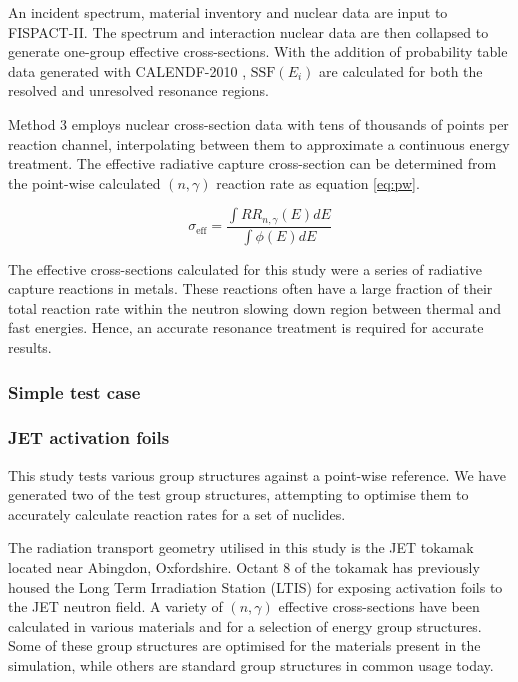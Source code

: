 An incident spectrum, material inventory and nuclear data are input to FISPACT-II. The spectrum and interaction nuclear data are then collapsed to generate one-group effective cross-sections. With the addition of probability table data generated with CALENDF-2010 \cite{sublet2011}, $\mathrm{SSF}(E_i)$ are calculated for both the resolved and unresolved resonance regions.

Method 3 employs nuclear cross-section data with tens of thousands of points per reaction channel, interpolating between them to approximate a continuous energy treatment. The effective radiative capture cross-section can be determined from the point-wise calculated $(n,\gamma)$ reaction rate as equation \ref{eq:pw}. 

\begin{equation}
\label{eq:pw}
\sigma_\mathrm{eff} = \frac{\int RR_{n,\gamma}(E) dE}{\int \phi(E) dE}
\end{equation}


The effective cross-sections calculated for this study were a series of radiative capture reactions in metals. These reactions often have a large fraction of their total reaction rate within the neutron slowing down region between thermal and fast energies. Hence, an accurate resonance treatment is required for accurate results. 

\subsubsection{Simple test case}

\subsubsection{JET activation foils}
This study tests various group structures against a point-wise reference. We have generated two of the test group structures, attempting to optimise them to accurately calculate reaction rates for a set of nuclides.

The radiation transport geometry utilised in this study is the JET tokamak located near Abingdon, Oxfordshire. Octant 8 of the tokamak has previously housed the Long Term Irradiation Station (LTIS) for exposing activation foils to the JET neutron field. A variety of $(n,\gamma)$ effective cross-sections have been calculated in various materials and for a selection of energy group structures. Some of these group structures are optimised for the materials present in the simulation, while others are standard group structures in common usage today. 

